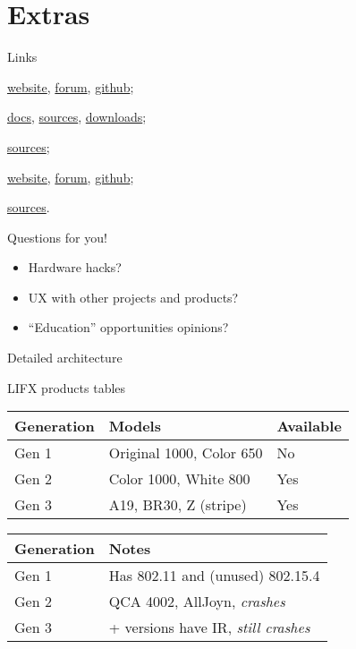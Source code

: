 \documentclass{lgtdslides}
\begin{document}
\section{Extras}

\begin{frame}{Links}
\begin{description}[pymonome]
\item[LIFX] \href{https://www.lifx.com/}{website}, \href{https://community.lifx.com/}{forum}, \href{https://github.com/lifx}{github}; 
\item[lightsd] \href{https://docs.lightsd.io/current/}{docs}, \href{https://github.com/lopter/lightsd/}{sources}, \href{https://downloads.lightsd.io/}{downloads};
\item[monolight] \href{https://github.com/lopter/lightsd/tree/master/apps/monolight}{sources};
\item[monome] \href{http://www.monome.org/}{website}, \href{http://llllllll.co/}{forum}, \href{https://github.com/monome}{github};
\item[pymonome] \href{https://github.com/artfwo/pymonome}{sources}.
\end{description}
\end{frame}

\begin{frame}{Questions for you!}
\begin{itemize}
\item Hardware hacks?
\item UX with other projects and products?
\item ``Education'' opportunities opinions?
\end{itemize}
\end{frame}

\begin{frame}{Detailed architecture}
\begin{center}
\end{center}
\end{frame}

\begin{frame}{LIFX products tables}
\begin{tabular}{lll}
\textbf{Generation} & \textbf{Models} & \textbf{Available} \\
\hline
Gen 1 & Original 1000, Color 650 & No \\
\hline
Gen 2 & Color 1000, White 800 & Yes \\
\hline
Gen 3 & A19, BR30, Z (stripe) & Yes \\
\end{tabular}
\par\vspace{2em}
\begin{tabular}{ll}
\textbf{Generation} & \textbf{Notes} \\
\hline
Gen 1 & Has 802.11 and (unused) 802.15.4 \\
\hline
Gen 2 & QCA 4002, AllJoyn, \emph{crashes} \\
\hline
Gen 3 & + versions have IR, \emph{still crashes} \\
\end{tabular}
\end{frame}
\end{document}
